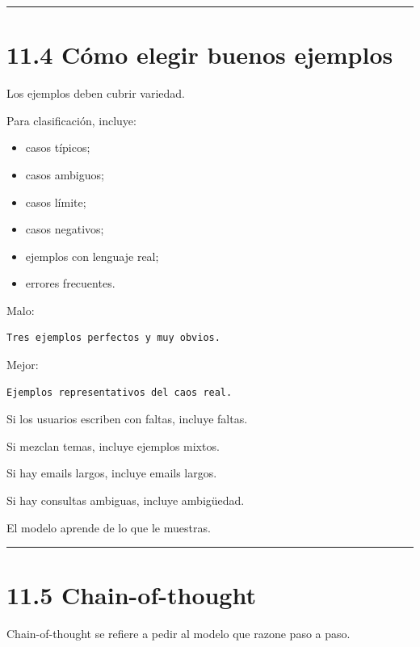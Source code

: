 \begin{center}\rule{0.5\linewidth}{0.5pt}\end{center}

\section{11.4 Cómo elegir buenos
ejemplos}\label{cuxf3mo-elegir-buenos-ejemplos}

Los ejemplos deben cubrir variedad.

Para clasificación, incluye:

\begin{itemize}
\tightlist
\item
  casos típicos;
\item
  casos ambiguos;
\item
  casos límite;
\item
  casos negativos;
\item
  ejemplos con lenguaje real;
\item
  errores frecuentes.
\end{itemize}

Malo:

\begin{lstlisting}
Tres ejemplos perfectos y muy obvios.
\end{lstlisting}

Mejor:

\begin{lstlisting}
Ejemplos representativos del caos real.
\end{lstlisting}

Si los usuarios escriben con faltas, incluye faltas.

Si mezclan temas, incluye ejemplos mixtos.

Si hay emails largos, incluye emails largos.

Si hay consultas ambiguas, incluye ambigüedad.

El modelo aprende de lo que le muestras.

\begin{center}\rule{0.5\linewidth}{0.5pt}\end{center}

\section{11.5 Chain-of-thought}\label{chain-of-thought}

Chain-of-thought se refiere a pedir al modelo que razone paso a paso.

